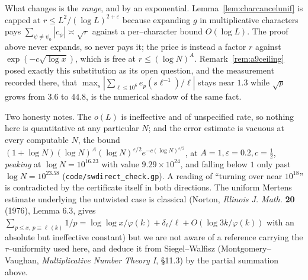 \documentclass[11pt]{article}
\theoremstyle{definition}
\begin{document}
What changes is the \emph{range}, and by an exponential. Lemma~\ref{lem:charcancelunif} is capped at
$r\le L^2/(\log L)^{2+\varepsilon}$ because expanding $g$ in multiplicative characters pays
$\sum_{\psi\ne\psi_0}|c_\psi|\asymp\sqrt r$ against a per--character bound $O(\log L)$. The proof
above never expands, so never pays it; the price is instead a factor $r$ against
$\exp(-c\sqrt{\log x})$, which is free at $r\le(\log N)^A$. Remark~\ref{rem:a9ceiling} posed exactly
this substitution as its open question, and the measurement recorded there, that
$\max_s|\sum_{\ell\le10^6}e_p(s\ell^{-1})/\ell|$ stays near $1.3$ while $\sqrt p$ grows from $3.6$
to $44.8$, is the numerical shadow of the same fact.

Two honesty notes. The $o(L)$ is ineffective and of unspecified rate, so nothing here is
quantitative at any particular $N$; and the error estimate is vacuous at every computable $N$, the
bound $(1+\log N)(\log N)^{A}(\log N)^{\varepsilon/2}e^{-c(\log N)^{\varepsilon/2}}$, at
$A=1,\varepsilon=0.2,c=\tfrac12$, \emph{peaking} at $\log N=10^{16.23}$ with value
$9.29\times10^{24}$, and falling below $1$ only past $\log N=10^{23.58}$
\textup{(\texttt{code/swdirect\_check.gp})}. A reading of ``turning over near $10^{18}$'' is contradicted by the certificate itself in both directions. The uniform Mertens estimate underlying the untwisted
case is classical (Norton, \emph{Illinois J. Math.} \textbf{20} (1976), Lemma 6.3, gives
$\sum_{p\le x,\,p\equiv\ell\,(k)}1/p=\log\log x/\varphi(k)+\delta_\ell/\ell+O(\log 3k/\varphi(k))$
with an absolute but ineffective constant) but we are not aware of a reference carrying the
$\tau$--uniformity used here, and deduce it from Siegel--Walfisz \textup{(}Montgomery--Vaughan,
\emph{Multiplicative Number Theory I}, \S11.3\textup{)} by the partial summation above.
\end{document}
